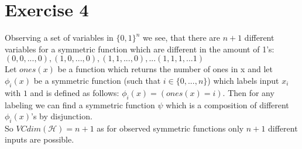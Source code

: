 \documentclass{article}
\begin{document}
\section*{Exercise 4}
Observing a set of variables in $\{0,1\}^n$ we see, that there are $n+1$ different variables for a symmetric function which are different in the amount of 1's: \\ ${(0,0,..., 0), (1,0,..., 0), (1,1,..., 0), ... (1,1,1, ... 1)}$ \\
Let $ones(x)$ be a function which returns the number of ones in x and let $\phi_i(x)$ be a symmetric function (such that $i\in\{0,..., n\}$) which labels input $x_i$ with $1$ and is defined as follows:
$\phi_i(x) = (ones(x) = i)$.
Then for any labeling we can find a symmetric function $\psi$ which is a composition of different  $\phi_i(x)$'s by disjunction. \\
So $VCdim(\mathcal{H}) = n+1$ as for observed symmetric functions only $n+1$ different inputs are possible.
\end{document}

